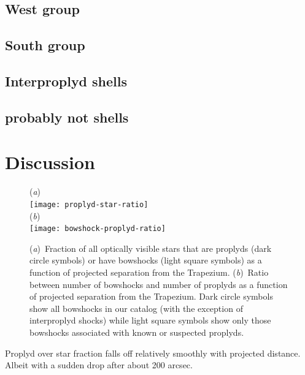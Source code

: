\documentclass[iop, apj]{emulateapj}
\begin{document}
\clearpage
\subsection{West group}
\label{sec:w-group}



\clearpage
\subsection{South group}
\label{sec:s-group}



\clearpage
\subsection{Interproplyd shells}
\label{sec:interproplyd-group}



\clearpage
\subsection{probably not shells}
\label{sec:problematic-group}



\clearpage
\section{Discussion}
\label{sec:discuss}
\begin{figure}
  (\textit{a})\\
  \texttt{[image: proplyd-star-ratio]}\\
  (\textit{b})\\
  \texttt{[image: bowshock-proplyd-ratio]}
  \caption{(\textit{a})~Fraction of all optically visible stars that
    are proplyds (dark circle symbols) or have bowshocks (light square
    symbols) as a function of projected separation from the Trapezium.
    (\textit{b})~Ratio between number of bowshocks and number of
    proplyds as a function of projected separation from the Trapezium.
    Dark circle symbols show all bowshocks in our catalog (with the
    exception of interproplyd shocks) while light square symbols show
    only those bowshocks associated with known or suspected proplyds.
  }
  \label{fig:bow-proplyd-star-ratios}
\end{figure}

Proplyd over star fraction falls off relatively smoothly with projected distance.  Albeit with a sudden drop after about 200 arcsec.
\end{document}
